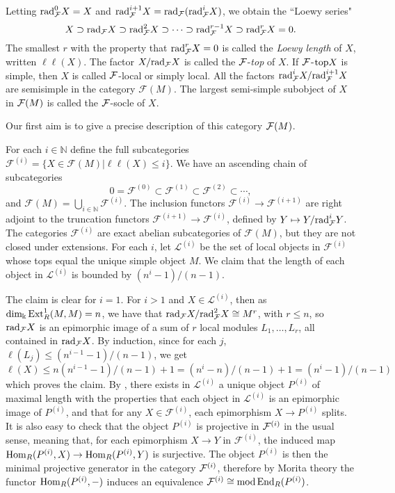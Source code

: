 \documentclass[10pt]{amsart}
\begin{document}
\noindent  Letting
$\mbox{rad}_{\mathcal F}^0X=X$ and $\mbox{rad}_{\mathcal F}^{i+1}X = \mbox{rad}_{\mathcal F}(\mbox{rad}_{\mathcal F}^iX)$, we obtain the ``Loewy series"
$$X\supset\mbox{rad}_{\mathcal F} X\supset\mbox{rad}_{\mathcal F}^2X\supset\cdots\supset\mbox{rad}_{\mathcal F} ^{r-1}X\supset\mbox{rad}_{\mathcal F} ^rX =0.$$
The smallest $r$ with the property that $\mbox{rad}_{\mathcal F} ^rX=0$ is called the
{\em Loewy length} of $X$, written $\ell\ell(X)$. The factor $X/{\mbox{rad}_{\mathcal F} X}$ is called the
$\mathcal F$-{\em top} of $X$. If  $\mathcal F$-$\mbox{top} X$ is simple, then $X$ is  called $\mathcal F$-local or simply local.
All the factors $\mbox{rad}_{\mathcal F}^iX/{\mbox{rad}_{\mathcal F} ^{i+1}X}$ are semisimple
in the category $\mathcal F(M)$. The largest semi-simple subobject of $X$ in $\mathcal F (M)$ is called 
the $\mathcal F$-socle of $X$.

\smallskip
\noindent Our first aim is to give a precise description of this category $\mathcal F (M)$. 

\noindent For each $i\in\mathbb N$ define the full subcategories $\mathcal F^{(i)} =
\{X\in\mathcal F(M)|\ell\ell(X)\leq i\}.$  We have an ascending chain of subcategories
$$0=\mathcal F^{(0)}\subset \mathcal F^{(1)} \subset \mathcal F^{(2)}\subset\cdots,$$
\noindent and $\mathcal F(M)= \bigcup_{i\in\mathbb N}\mathcal F^{(i)}$.  The inclusion functors $\mathcal F^{(i)}\to\mathcal F^{(i+1)}$ are right adjoint to the truncation functors
$\mathcal F^{(i+1)}\to\mathcal F^{(i)}$, defined by  $Y\mapsto Y/{\mbox{rad}_{\mathcal F} ^{i}}Y$.
The categories $\mathcal F^{(i)}$
are exact abelian subcategories of $\mathcal F(M)$, but they are not closed under extensions.
 For each $i$, let $\mathcal L^{(i)}$
 be the set of local objects in $\mathcal F^{(i)}$ whose tops equal the unique 
 simple object $M$. We claim that the length of each object in $\mathcal L^{(i)}$
is bounded by $(n^i-1)/(n-1)$.

\smallskip 
\noindent The claim is clear for $i=1$.  For $i>1$ and $X\in \mathcal L^{(i)}$, then as $\operatorname{dim}\nolimits_{\Bbbk}\operatorname{Ext}\nolimits_R^1 (M,M) =n$,
we have that $\mbox{rad}_{\mathcal F}X/\mbox{rad}^2_{\mathcal F}X \cong M^r$, with $r\leq n$, so $\mbox{rad}_{\mathcal F}X$ is an epimorphic image of a sum
of $r$ local modules $L_1,\ldots , L_r$, all contained in $\mbox{rad}_{\mathcal F}X$.
By induction, since for each $j$, $\ell (L_j) \leq (n^{i-1}-1)/(n-1)$, we get $$\ell(X)\leq n(n^{i-1}-1)/(n-1)+1=(n^i-n)/(n-1)+1=(n^i-1)/(n-1)$$
which proves the claim. By \cite{K}, there exists in $\mathcal L^{(i)}$ a unique
object $P^{(i)}$ of maximal length with the properties that each object
in $\mathcal L^{(i)}$ is an epimorphic image of $P^{(i)}$,
and that for any $X \in\mathcal F^{(i)}$, each
epimorphism $X\to P^{(i)}$ splits. It is also easy to check that the object $P^{(i)}$ is projective in $\mathcal F^{(i)}$ in the usual sense, meaning that, for each
epimorphism $X\to Y$ in $\mathcal F^{(i)}$, the induced map $\operatorname{Hom}_R (P^{(i)},X)\to\operatorname{Hom}_R (P^{(i)},Y)$ is
surjective.  
\noindent
The object $P^{(i)}$ is then the minimal projective generator in the category $\mathcal F^{(i)}$,
therefore by Morita theory the functor $\operatorname{Hom}_R(P^{(i)},-)$ induces an equivalence 
$\mathcal F^{(i)}\cong\operatorname{mod}\operatorname{End}_R( P^{(i)})$.
\end{document}
